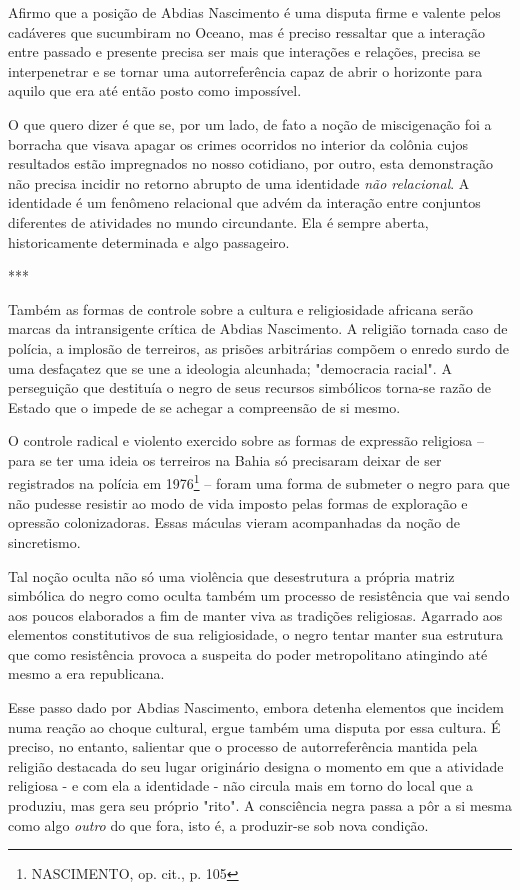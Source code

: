 Afirmo que a posição de Abdias Nascimento é uma disputa firme e valente
pelos cadáveres que sucumbiram no Oceano, mas é preciso ressaltar que a
interação entre passado e presente precisa ser mais que interações e
relações, precisa se interpenetrar e se tornar uma autorreferência capaz
de abrir o horizonte para aquilo que era até então posto como
impossível.

O que quero dizer é que se, por um lado, de fato a noção de miscigenação
foi a borracha que visava apagar os crimes ocorridos no interior da
colônia cujos resultados estão impregnados no nosso cotidiano, por
outro, esta demonstração não precisa incidir no retorno abrupto de uma
identidade \emph{não relacional}. A identidade é um fenômeno relacional
que advém da interação entre conjuntos diferentes de atividades no mundo
circundante. Ela é sempre aberta, historicamente determinada e algo
passageiro.

***

Também as formas de controle sobre a cultura e religiosidade africana
serão marcas da intransigente crítica de Abdias Nascimento. A religião
tornada caso de polícia, a implosão de terreiros, as prisões arbitrárias
compõem o enredo surdo de uma desfaçatez que se une a ideologia
alcunhada; "democracia racial". A perseguição que destituía o negro de
seus recursos simbólicos torna-se razão de Estado que o impede de se
achegar a compreensão de si mesmo.

O controle radical e violento exercido sobre as formas de expressão
religiosa -- para se ter uma ideia os terreiros na Bahia só precisaram
deixar de ser registrados na polícia em 1976\footnote{NASCIMENTO, op.
  cit., p. 105} -- foram uma forma de submeter o negro para que não
pudesse resistir ao modo de vida imposto pelas formas de exploração e
opressão colonizadoras. Essas máculas vieram acompanhadas da noção de
sincretismo.

Tal noção oculta não só uma violência que desestrutura a própria matriz
simbólica do negro como oculta também um processo de resistência que vai
sendo aos poucos elaborados a fim de manter viva as tradições
religiosas. Agarrado aos elementos constitutivos de sua religiosidade, o
negro tentar manter sua estrutura que como resistência provoca a
suspeita do poder metropolitano atingindo até mesmo a era republicana.

Esse passo dado por Abdias Nascimento, embora detenha elementos que
incidem numa reação ao choque cultural, ergue também uma disputa por
essa cultura. É preciso, no entanto, salientar que o processo de
autorreferência mantida pela religião destacada do seu lugar originário
designa o momento em que a atividade religiosa - e com ela a identidade
- não circula mais em torno do local que a produziu, mas gera seu
próprio "rito". A consciência negra passa a pôr a si mesma como algo
\emph{outro} do que fora, isto é, a produzir-se sob nova condição.

